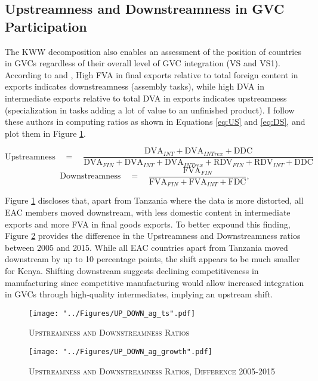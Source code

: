 \documentclass[a4paper]{article}
\begin{document}
\subsection{Upstreamness and Downstreamness in GVC Participation}

The KWW decomposition also enables an assessment of the position of countries in GVCs regardless of their overall level of GVC integration (VS and VS1). According to \citet{Kummritz20162} and \citet{wang2013quantifying}, High FVA in final exports relative to total foreign content in exports indicates downstreamness (assembly tasks), while high DVA in intermediate exports relative to total DVA in exports indicates upstreamness (specialization in tasks adding a lot of value to an unfinished product). I follow these authors in computing ratios as shown in Equations \ref{eq:US} and \ref{eq:DS}, and plot them in Figure \ref{fig:UP_DOWN_ag_ts}.  

\begin{equation} \label{eq:US}
\text{Upstreamness}\quad =\quad \frac{\text{DVA}_{INT} + \text{DVA}_{INTrex} + \text{DDC}}{\text{DVA}_{FIN} + \text{DVA}_{INT} + \text{DVA}_{INTrex} + \text{RDV}_{FIN} + \text{RDV}_{INT} + \text{DDC}}
\end{equation}
\begin{equation} \label{eq:DS}
\text{Downstreamness}\quad =\quad \frac{\text{FVA}_{FIN}}{\text{FVA}_{FIN} + \text{FVA}_{INT} + \text{FDC}},
\end{equation}

Figure \ref{fig:UP_DOWN_ag_ts} discloses that, apart from Tanzania where the data is more distorted, all EAC members moved downstream, with less domestic content in intermediate exports and more FVA in final goods exports. To better expound this finding, Figure \ref{fig:UP_DOWN_ag_growth} provides the difference in the Upstreamness and Downstreamness ratios between 2005 and 2015. While all EAC countries apart from Tanzania moved downstream by up to 10 percentage points, the shift appears to be much smaller for Kenya. Shifting downstream suggests declining competitiveness in manufacturing since competitive manufacturing would allow increased integration in GVCs through high-quality intermediates, implying an upstream shift. 

\begin{figure}[h!] 
\centering
\caption{\label{fig:UP_DOWN_ag_ts}\textsc{Upstreamness and Downstreamness Ratios}}
\texttt{[image: "../Figures/UP\_DOWN\_ag\_ts".pdf]} %
\vspace{-1cm}
\end{figure} 
\begin{figure}[h!]
\centering
\caption{\label{fig:UP_DOWN_ag_growth}\textsc{Upstreamness and Downstreamness Ratios, Difference 2005-2015}}
\texttt{[image: "../Figures/UP\_DOWN\_ag\_growth".pdf]} %
\end{figure}
\FloatBarrier
\end{document}
